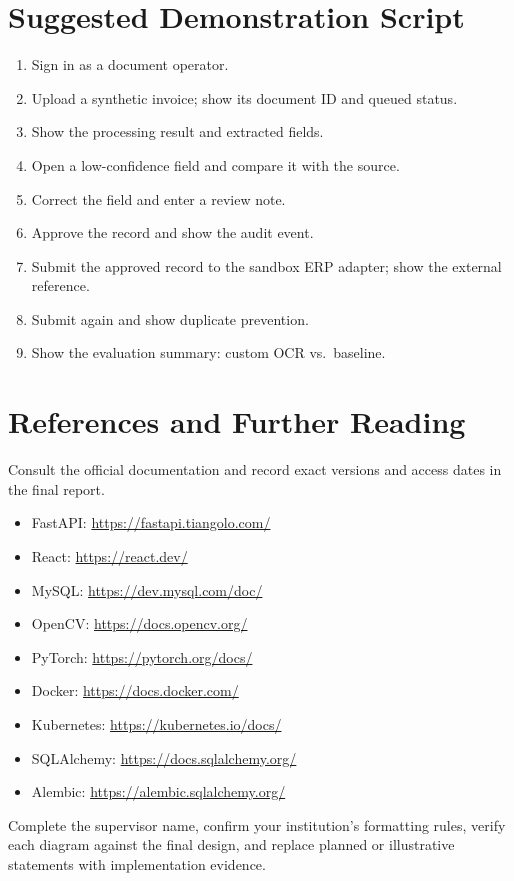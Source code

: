 \documentclass[11pt,a4paper]{report}
\begin{document}
\chapter{Suggested Demonstration Script}
\begin{enumerate}
\item Sign in as a document operator.
\item Upload a synthetic invoice; show its document ID and queued status.
\item Show the processing result and extracted fields.
\item Open a low-confidence field and compare it with the source.
\item Correct the field and enter a review note.
\item Approve the record and show the audit event.
\item Submit the approved record to the sandbox ERP adapter; show the external reference.
\item Submit again and show duplicate prevention.
\item Show the evaluation summary: custom OCR vs.\ baseline.
\end{enumerate}

\chapter{References and Further Reading}
Consult the official documentation and record exact versions and access dates in the final report.
\begin{itemize}
\item FastAPI: \url{https://fastapi.tiangolo.com/}
\item React: \url{https://react.dev/}
\item MySQL: \url{https://dev.mysql.com/doc/}
\item OpenCV: \url{https://docs.opencv.org/}
\item PyTorch: \url{https://pytorch.org/docs/}
\item Docker: \url{https://docs.docker.com/}
\item Kubernetes: \url{https://kubernetes.io/docs/}
\item SQLAlchemy: \url{https://docs.sqlalchemy.org/}
\item Alembic: \url{https://alembic.sqlalchemy.org/}
\end{itemize}

\begin{warnbox}
Complete the supervisor name, confirm your institution's formatting rules, verify each diagram against the final design, and replace planned or illustrative statements with implementation evidence.
\end{warnbox}
\end{document}
